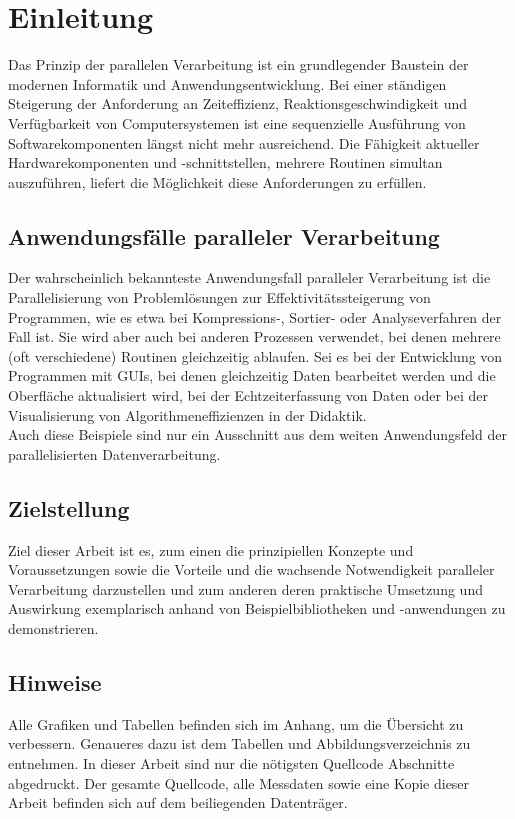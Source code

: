 \chapter{Einleitung}
Das Prinzip der parallelen Verarbeitung ist ein grundlegender Baustein der modernen Informatik und Anwendungsentwicklung. Bei einer ständigen Steigerung der Anforderung an Zeiteffizienz, Reaktionsgeschwindigkeit und Verfügbarkeit von Computersystemen ist eine sequenzielle Ausführung von Softwarekomponenten längst nicht mehr ausreichend. Die Fähigkeit aktueller Hardwarekomponenten und -schnittstellen, mehrere Routinen simultan auszuführen, liefert die Möglichkeit diese Anforderungen zu erfüllen.

\section{Anwendungsfälle paralleler Verarbeitung}
Der wahrscheinlich bekannteste Anwendungsfall paralleler Verarbeitung ist die Parallelisierung von Problemlösungen zur Effektivitätssteigerung von Programmen, wie es etwa bei Kompressions-, Sortier- oder Analyseverfahren der Fall ist. Sie wird aber auch bei anderen Prozessen verwendet, bei denen mehrere (oft verschiedene) Routinen gleichzeitig ablaufen. Sei es bei der Entwicklung von Programmen mit \acp{GUI}, bei denen gleichzeitig Daten bearbeitet werden und die Oberfläche aktualisiert wird, bei der Echtzeiterfassung von Daten oder bei der Visualisierung von Algorithmeneffizienzen in der Didaktik.\\
Auch diese Beispiele sind nur ein Ausschnitt aus dem weiten Anwendungsfeld der parallelisierten Datenverarbeitung.

\section{Zielstellung}
Ziel dieser Arbeit ist es, zum einen die prinzipiellen Konzepte und Voraussetzungen sowie die Vorteile und die wachsende Notwendigkeit paralleler Verarbeitung darzustellen und zum anderen deren praktische Umsetzung und Auswirkung exemplarisch anhand von Beispielbibliotheken und -anwendungen zu demonstrieren.

\section{Hinweise}
Alle Grafiken und Tabellen befinden sich im Anhang, um die Übersicht zu verbessern. Genaueres dazu ist dem Tabellen und Abbildungsverzeichnis zu entnehmen. In dieser Arbeit sind nur die nötigsten Quellcode Abschnitte abgedruckt. Der gesamte Quellcode, alle Messdaten sowie eine Kopie dieser Arbeit befinden sich auf dem beiliegenden Datenträger.
